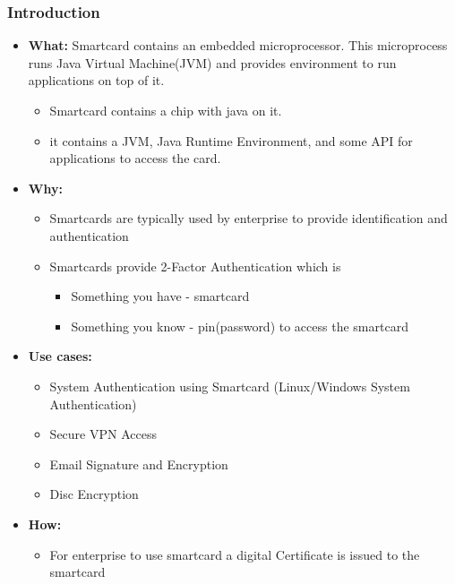 \documentclass[12pt]{report}
\begin{document}
\subsubsection{Introduction}
    \begin{itemize}
        \item \textbf{What:} Smartcard contains an embedded microprocessor. This microprocess runs Java Virtual Machine(JVM) and 
            provides environment to run applications on top of it. 
            \begin{itemize}
                \item Smartcard contains a chip with java on it. 
                \item it contains a JVM, Java Runtime Environment, and some API for applications to access the card.
            \end{itemize}
        \item \textbf{Why:} 
            \begin{itemize}
                \item Smartcards are typically used by enterprise to provide identification and authentication
                \item Smartcards provide 2-Factor Authentication which is 
                    \begin{itemize}
                        \item Something you have - smartcard
                        \item Something you know - pin(password) to access the smartcard
                    \end{itemize}
            \end{itemize}
        \item \textbf{Use cases:}
            \begin{itemize}
                \item System Authentication using Smartcard (Linux/Windows System Authentication)
                \item Secure VPN Access
                \item Email Signature and Encryption
                \item Disc Encryption
            \end{itemize}
        \item \textbf{How:}
            \begin{itemize}
                \item For enterprise to use smartcard a digital Certificate is issued to the smartcard

\end{itemize}
\end{itemize}
\end{document}
